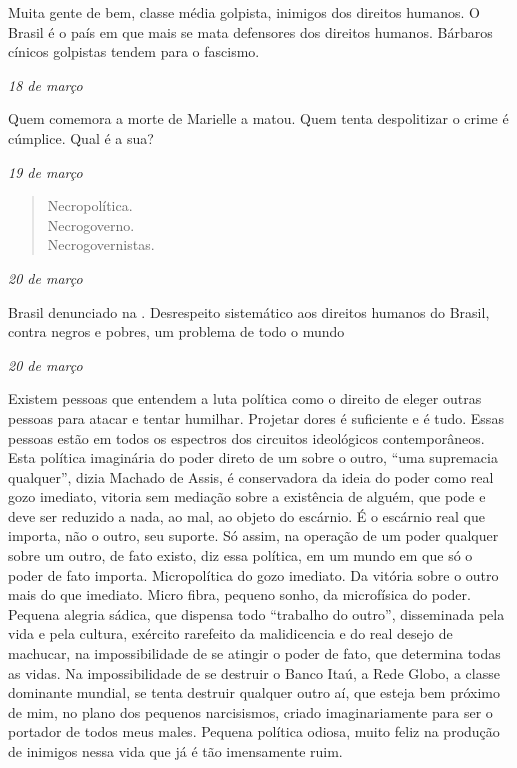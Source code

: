 Muita gente de bem, classe média golpista, inimigos dos direitos
humanos. O Brasil é o país em que mais se mata defensores dos direitos
humanos. Bárbaros cínicos golpistas tendem para o fascismo.

\begin{flushright}
\emph{18 de março}
\end{flushright}

Quem comemora a morte de Marielle a matou. Quem tenta despolitizar o
crime é cúmplice. Qual é a sua?

\pagebreak

\begin{flushright}
\emph{19 de março}
\end{flushright}

\begin{verse}
Necropolítica. \\
Necrogoverno. \\
Necrogovernistas. \\
\end{verse}

\begin{flushright}
\emph{20 de março}
\end{flushright}

Brasil denunciado na . Desrespeito sistemático aos direitos humanos
do Brasil, contra negros e pobres, um problema de todo o mundo

\begin{flushright}
\emph{20 de março}
\end{flushright}

Existem pessoas que entendem a luta política como o direito de eleger
outras pessoas para atacar e tentar humilhar. Projetar dores é
suficiente e é tudo. Essas pessoas estão em todos os espectros dos
circuitos ideológicos contemporâneos. Esta política imaginária do poder
direto de um sobre o outro, ``uma supremacia qualquer'', dizia Machado
de Assis, é conservadora da ideia do poder como real gozo imediato,
vitoria sem mediação sobre a existência de alguém, que pode e deve ser
reduzido a nada, ao mal, ao objeto do escárnio. É o escárnio real que
importa, não o outro, seu suporte. Só assim, na operação de um poder
qualquer sobre um outro, de fato existo, diz essa política, em um mundo
em que só o poder de fato importa. Micropolítica do gozo imediato. Da
vitória sobre o outro mais do que imediato. Micro fibra, pequeno sonho,
da microfísica do poder. Pequena alegria sádica, que dispensa todo
``trabalho do outro'', disseminada pela vida e pela cultura, exército
rarefeito da malidicencia e do real desejo de machucar, na
impossibilidade de se atingir o poder de fato, que determina todas as
vidas. Na impossibilidade de se destruir o Banco Itaú, a Rede Globo, a
classe dominante mundial, se tenta destruir qualquer outro aí, que
esteja bem próximo de mim, no plano dos pequenos narcisismos, criado
imaginariamente para ser o portador de todos meus males. Pequena
política odiosa, muito feliz na produção de inimigos nessa vida que já é
tão imensamente ruim.

